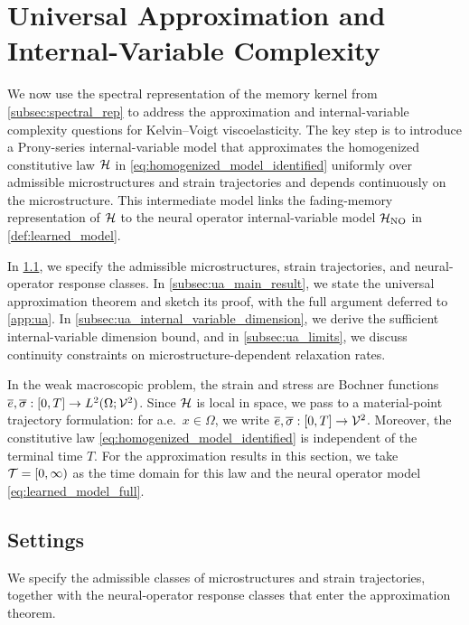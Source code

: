 \documentclass[3p, 12pt, preprint]{elsarticle}
\begin{document}
\section{Universal Approximation and Internal-Variable Complexity}\label{sec:universal_approximation}

We now use the spectral representation of the memory kernel from \cref{subsec:spectral_rep} to address the approximation and internal-variable complexity questions for Kelvin--Voigt viscoelasticity. The key step is to introduce a Prony-series internal-variable model that approximates the homogenized constitutive law ${\mathcal{H}}$ in \cref{eq:homogenized_model_identified} uniformly over admissible microstructures and strain trajectories and depends continuously on the microstructure. This intermediate model links the fading-memory representation of ${\mathcal{H}}$ to the neural operator internal-variable model ${\mathcal{H}}_{\rm NO}$ in \cref{def:learned_model}.

In \cref{subsec:ua_settings}, we specify the admissible microstructures, strain trajectories, and neural-operator response classes. In \cref{subsec:ua_main_result}, we state the universal approximation theorem and sketch its proof, with the full argument deferred to \cref{app:ua}. In \cref{subsec:ua_internal_variable_dimension}, we derive the sufficient internal-variable dimension bound, and in \cref{subsec:ua_limits}, we discuss continuity constraints on microstructure-dependent relaxation rates.

In the weak macroscopic problem, the strain and stress are Bochner functions $\overline e,\overline\sigma:[0,T]\to L^2(\Omega;{\mathcal{V}}^2)$. Since ${\mathcal{H}}$ is local in space, we pass to a material-point trajectory formulation: for a.e.\ $x\in\Omega$, we write $\overline{e},\overline{\sigma}:[0,T]\to{\mathcal{V}}^2$. {\color{blue}Moreover, the constitutive law \cref{eq:homogenized_model_identified} is independent of the terminal time $T$. For the approximation results in this section, we take ${\mathcal{T}}=[0,\infty)$ as the time domain for this law and the neural operator model \cref{eq:learned_model_full}.}

\subsection{Settings}\label{subsec:ua_settings}

We specify the admissible classes of microstructures and strain trajectories, together with the neural-operator response classes that enter the approximation theorem. 
\end{document}
